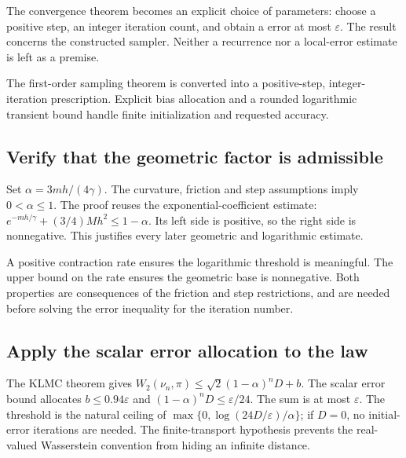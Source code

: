 \documentclass[11pt,a4paper]{report}
\begin{document}
The convergence theorem becomes an explicit choice of parameters: choose a positive step, an integer iteration count, and obtain a error at most \(\varepsilon\). The result concerns the constructed sampler. Neither a recurrence nor a local-error estimate is left as a premise.



The first-order sampling theorem is converted into a positive-step, integer-iteration prescription. Explicit bias allocation and a rounded logarithmic transient bound handle finite initialization and requested accuracy.

\subsection{\texorpdfstring{Verify that the geometric factor is admissible}{Verify that the geometric factor is admissible}}
\label{report-step-KineticLangevin-Accuracy-lean-1}


Set \(\alpha=3mh/(4\gamma)\). The curvature, friction and step assumptions imply \(0<\alpha\le1\). The proof reuses the exponential-coefficient estimate: \(e^{-mh/\gamma}+(3/4)Mh^2\le1-\alpha\). Its left side is positive, so the right side is nonnegative. This justifies every later geometric and logarithmic estimate.



A positive contraction rate ensures the logarithmic threshold is meaningful. The upper bound on the rate ensures the geometric base is nonnegative. Both properties are consequences of the friction and step restrictions, and are needed before solving the error inequality for the iteration number.

\subsection{\texorpdfstring{Apply the scalar error allocation to the law}{Apply the scalar error allocation to the law}}
\label{report-step-KineticLangevin-Accuracy-lean-2}


The KLMC theorem gives \(W_2(\nu_n,\pi)\le\sqrt2(1-\alpha)^nD+b\). The scalar error bound allocates \(b\le0.94\varepsilon\) and \((1-\alpha)^nD\le\varepsilon/24\). The sum is at most \(\varepsilon\). The threshold is the natural ceiling of \(\max\{0,\log(24D/\varepsilon)/\alpha\}\); if \(D=0\), no initial-error iterations are needed. The finite-transport hypothesis prevents the real-valued Wasserstein convention from hiding an infinite distance.
\end{document}
